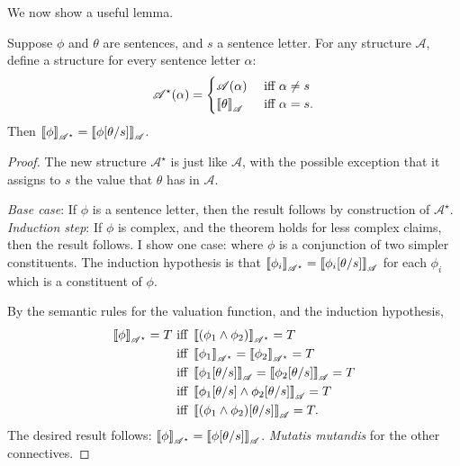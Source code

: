 We now show a useful lemma. \begin{lemma}[Substitution]\label{sublem}
	Suppose $\phi$ and $\theta$ are sentences, and $s$ a sentence letter. For any structure $\mathscr{A}$, define a structure for every sentence letter $\alpha$: $$\mathscr{A}^{\star}(\alpha) = \begin{cases} \mathscr{A}(\alpha) &\text{ iff } \alpha \neq s \\
	\left\llbracket \theta\right\rrbracket_{\mathscr{A}} &\text{ iff } \alpha = s.
		\end{cases}$$ Then $\left\llbracket \phi\right\rrbracket_{\mathscr{A^{\star}}}= \left\llbracket \phi[\theta/s]\right\rrbracket_{\mathscr{A}}$. 
\begin{proof}	The new structure $\mathscr{A}^{\star}$ is just like $\mathscr{A}$, with the possible exception that it assigns to $s$ the value that $\theta$ has in $\mathscr{A}$.

\noindent	\emph{Base case}: If $\phi$ is a sentence letter, then the result follows by construction of $\mathscr{A}^{\star}$.\\
		\emph{Induction step}: If $\phi$ is complex, and the theorem holds for less complex claims, then the result follows. I show one case: where $\phi$ is a conjunction of two simpler constituents. The induction hypothesis is that  $\left\llbracket \phi_{i}\right\rrbracket_{\mathscr{A^{\star}}} = \left\llbracket \phi_{i}[\theta/s]\right\rrbracket_{\mathscr{A}}$ for each $\phi_{i}$ which is a constituent of $\phi$.

By the semantic rules for the valuation function, and the induction hypothesis, \begin{align*}
	\left\llbracket \phi\right\rrbracket_{\mathscr{A^{\star}}} = T &\text{ iff } \left\llbracket (\phi_{1} \wedge \phi_{2})\right\rrbracket_{\mathscr{A^{\star}}} = T\\ &\text{ iff } \left\llbracket \phi_{1}\right\rrbracket_{\mathscr{A^{\star}}}=\left\llbracket \phi_{2}\right\rrbracket_{\mathscr{A^{\star}}}=T\\ &\text{ iff } \left\llbracket \phi_{1}[\theta/s]\right\rrbracket_{\mathscr{A}}=\left\llbracket \phi_{2}[\theta/s]\right\rrbracket_{\mathscr{A}}=T\\ &\text{ iff } \left\llbracket \phi_{1}[\theta/s] \wedge \phi_{2}[\theta/s]\right\rrbracket_{\mathscr{A}}=T\\ &\text{ iff } \left\llbracket (\phi_{1} \wedge \phi_{2})[\theta/s]\right\rrbracket_{\mathscr{A}}=T.
\end{align*}
The desired result follows: $\left\llbracket \phi\right\rrbracket_{\mathscr{A^{\star}}} = \left\llbracket \phi[\theta/s]\right\rrbracket_{\mathscr{A}}$. \emph{Mutatis mutandis} for the other connectives. 
\end{proof} 
\end{lemma}


